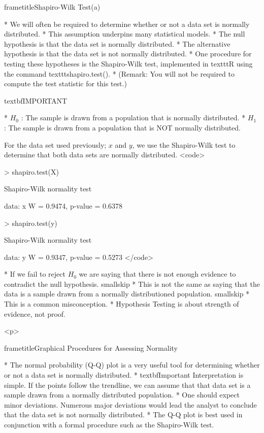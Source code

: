 






frametitle{Shapiro-Wilk Test(a)}



 * We will often be required to determine whether or not a data set is normally distributed.
 * This assumption underpins many statistical models.
 * The null hypothesis is that the data set is normally distributed.
 * The alternative hypothesis is that the data set is not normally distributed.
 * One procedure for testing these hypotheses is the Shapiro-Wilk test, implemented in texttt{R} using the command texttt{shapiro.test()}.
 * (Remark: You will not be required to compute the test statistic for this test.)



textbf{IMPORTANT}

 * $H_0$ : The sample is drawn from a population that is normally distributed. 
 * $H_1$ : The sample is drawn from a population that is NOT normally distributed. 




For the data set used previously; $x$ and $y$, we use the Shapiro-Wilk test to determine that both data sets are normally distributed.
<code>

> shapiro.test(X)

        Shapiro-Wilk normality test

data:  x
W = 0.9474, p-value = 0.6378

> shapiro.test(y)

        Shapiro-Wilk normality test

data:  y
W = 0.9347, p-value = 0.5273
</code>



 * If we fail to reject $H_0$ we are saying that there is not enough evidence to contradict the null hypothesis. smallskip
 * This is not the same as saying that the data is a sample drawn from a normally distributioned population. smallskip
 * This is a common misconception.
 * Hypothesis Testing is about strength of evidence, not proof.

<p>

frametitle{Graphical Procedures for Assessing Normality}


 * The normal probability (Q-Q) plot is a very useful tool for determining whether or not a data set is normally distributed.
 * textbf{Important} Interpretation is simple. If the points follow the trendline, we can assume that that data set is a sample drawn from a normally distributed population.
 * One should expect minor deviations. Numerous major deviations would lead the analyst to conclude that the data set is not normally distributed.
 * The Q-Q plot is best used in conjunction with a formal procedure such as the Shapiro-Wilk test.


